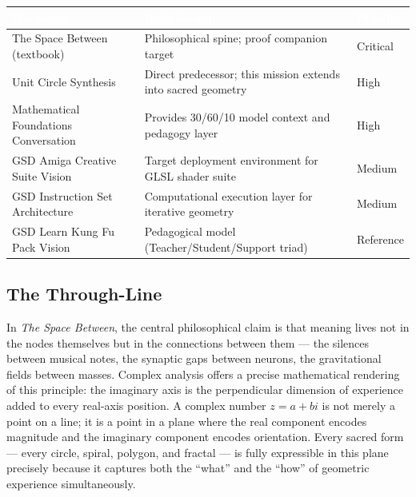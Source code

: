 \documentclass[11pt,letterpaper]{article}
\newcommand{\tableheader}[1]{\textbf{\sffamily\textcolor{white}{#1}}}
\begin{document}
\begin{center}
\begin{tabularx}{\textwidth}{L{4.5cm}XC{2.2cm}}
\toprule
{}
\tableheader{Document} & \tableheader{Relationship} & \tableheader{Priority} \\
\midrule
The Space Between (textbook) & Philosophical spine; proof companion target & Critical \\
Unit Circle Synthesis & Direct predecessor; this mission extends into sacred geometry & High \\
Mathematical Foundations Conversation & Provides 30/60/10 model context and pedagogy layer & High \\
GSD Amiga Creative Suite Vision & Target deployment environment for GLSL shader suite & Medium \\
GSD Instruction Set Architecture & Computational execution layer for iterative geometry & Medium \\
GSD Learn Kung Fu Pack Vision & Pedagogical model (Teacher/Student/Support triad) & Reference \\
\bottomrule
\end{tabularx}
\end{center}

\subsection{The Through-Line}

In \textit{The Space Between}, the central philosophical claim is that meaning lives not in the nodes themselves but in the connections between them --- the silences between musical notes, the synaptic gaps between neurons, the gravitational fields between masses. Complex analysis offers a precise mathematical rendering of this principle: the imaginary axis is the perpendicular dimension of experience added to every real-axis position. A complex number $z = a + bi$ is not merely a point on a line; it is a point in a plane where the real component encodes magnitude and the imaginary component encodes orientation. Every sacred form --- every circle, spiral, polygon, and fractal --- is fully expressible in this plane precisely because it captures both the ``what'' and the ``how'' of geometric experience simultaneously.
\end{document}

